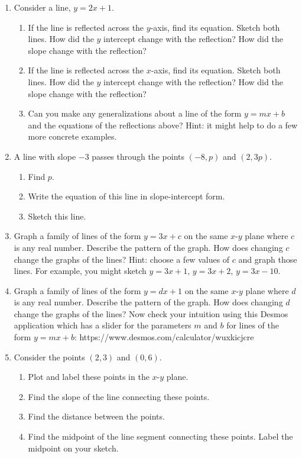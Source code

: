 \documentclass[12pt]{amsart}
\begin{document}
\begin{enumerate}
\item Consider a line, $y=2x+1$.  
 \begin{enumerate}
     \item If the line is reflected across the $y$-axis, find its equation.  Sketch both lines.  How did the $y$ intercept change with the reflection?  How did the slope change with the reflection?
      \item If the line is reflected across the $x$-axis, find its equation.  Sketch both lines.  How did the $y$ intercept change with the reflection?  How did the slope change with the reflection?
      \item Can you make any generalizations about a line of the form $y=mx+b$ and the equations of the reflections above?  Hint: it might help to do a few more concrete examples.
  \end{enumerate}
  
  
  \item A line with slope $-3$ passes through the points $(-8,p)$ and $(2,3p)$.
 \begin{enumerate}
     \item Find $p$.
      \item Write the equation of this line in slope-intercept form.
      \item Sketch this line.
  \end{enumerate}
  
 \item Graph a family of lines  of the form $y=3x+c$ on the same $x$-$y$ plane where $c$ is any real number.  Describe the pattern of the graph.  How does changing $c$ change the graphs of the lines?  Hint: choose a few values of $c$ and graph those lines.  For example, you might sketch $y=3x+1$, $y=3x+2$, $y=3x-10$.
  
\item Graph a family of lines  of the form $y=dx+1$ on the same $x$-$y$ plane where $d$ is any real number.  Describe the pattern of the graph.  How does changing $d$ change the graphs of the lines?  Now check your intuition using this Desmos application which has a slider for the parameters $m$ and $b$ for lines of the form $y=mx+b$: https://www.desmos.com/calculator/wuxkicjcre


\item Consider the points $(2,3)$ and $(0,6)$.
\begin{enumerate}
     \item Plot and label these points in the $x$-$y$ plane.
     \item Find the slope of the line connecting these points.
     \item Find the distance between the points.
     \item Find the midpoint of the line segment connecting these points.  Label the midpoint on your sketch.
    \end{enumerate}


\end{enumerate}
\end{document}
